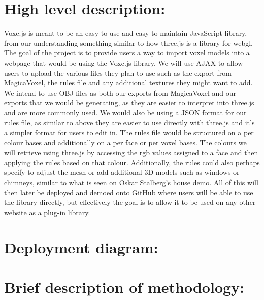 \documentclass[english]{article}
\begin{document}
	\section{High level description:}
	Voxc.js is meant to be an easy to use and easy to maintain JavaScript library, from our understanding something similar to how three.js is a library for webgl. The goal of the project is to provide users a way to import voxel models into a webpage that would be using the Voxc.js library.
		\newline
	\newline
	We will use AJAX to allow users to upload the various files they plan to use such as the export from MagicaVoxel, the rules file and any additional textures they might want to add.
	\newline
\newline
	We intend to use OBJ files as both our exports from MagicaVoxel and our exports that we would be generating, as they are easier to interpret into three.js and are more commonly used. We would also be using a JSON format for our rules file, as similar to above they are easier to use directly with three.js and it’s a simpler format for users to edit in.
	\newline
\newline
	The rules file would be structured on a per colour bases and additionally on a per face or per voxel bases. The colours we will retrieve using three.js by accessing the rgb values assigned to a face and then applying the rules based on that colour. Additionally, the rules could also perhaps specify to adjust the mesh or add additional 3D models such as windows or chimneys, similar to what is seen on Oskar Stalberg’s house demo.
	\newline
\newline
	All of this will then later be deployed and demoed onto GitHub where users will be able to use the library directly, but effectively the goal is to allow it to be used on any other website as a plug-in library.
	\medskip
	
	\section{Deployment diagram:}
	\medskip
	\section{Brief description of methodology:}
	
\end{document}
